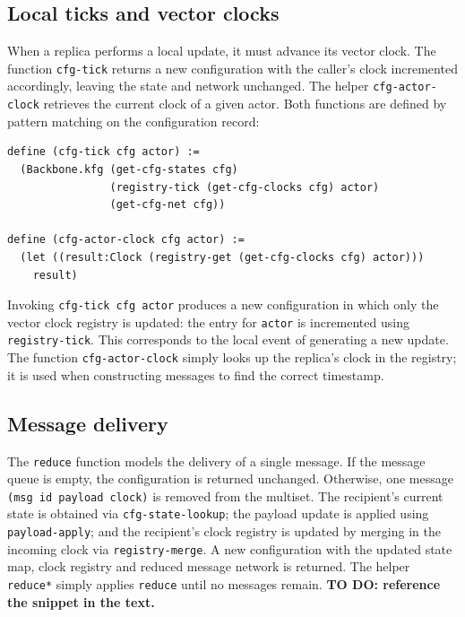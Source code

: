 \subsection{Local ticks and vector clocks}

When a replica performs a local update, it must advance its vector clock.  
The function \lstinline{cfg-tick} returns a new configuration with the caller’s clock incremented accordingly, leaving the state and network unchanged.  
The helper \lstinline{cfg-actor-clock} retrieves the current clock of a given actor.  
Both functions are defined by pattern matching on the configuration record:

\begin{lstlisting}[language=Athena,style=athena]
define (cfg-tick cfg actor) :=
  (Backbone.kfg (get-cfg-states cfg)
                (registry-tick (get-cfg-clocks cfg) actor)
                (get-cfg-net cfg))

define (cfg-actor-clock cfg actor) :=
  (let ((result:Clock (registry-get (get-cfg-clocks cfg) actor)))
    result)
\end{lstlisting}

Invoking \lstinline{cfg-tick cfg actor} produces a new configuration in which only the vector clock registry is updated:  
the entry for \lstinline{actor} is incremented using \lstinline{registry-tick}.  
This corresponds to the local event of generating a new update.  
The function \lstinline{cfg-actor-clock} simply looks up the replica’s clock in the registry; it is used when constructing messages to find the correct timestamp.

\subsection{Message delivery}



The \texttt{reduce} function models the delivery of a single message.  
If the message queue is empty, the configuration is returned unchanged.  
Otherwise, one message \lstinline{(msg id payload clock)} is removed from the multiset.  
The recipient’s current state is obtained via \lstinline{cfg-state-lookup};  
the payload update is applied using \lstinline{payload-apply};  
and the recipient’s clock registry is updated by merging in the incoming clock via \lstinline{registry-merge}.  
A new configuration with the updated state map, clock registry and reduced message network is returned.  
The helper \lstinline{reduce*} simply applies \lstinline{reduce} until no messages remain.
\textbf{TO DO: reference the snippet in the text.}  

